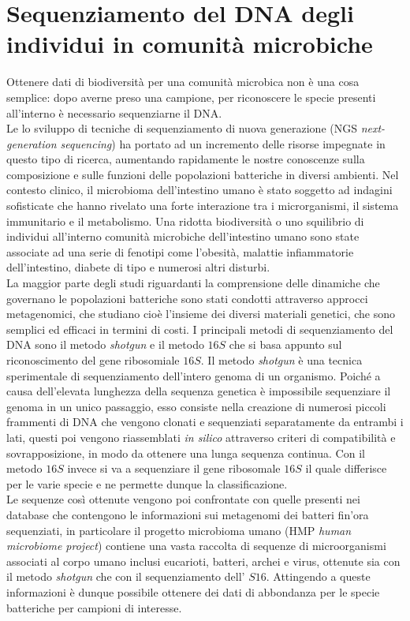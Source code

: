 \section{Sequenziamento del DNA degli individui in comunità microbiche}
Ottenere dati di biodiversità per una comunità microbica non è una cosa semplice: dopo averne preso una campione, per riconoscere le specie presenti all'interno è necessario sequenziarne il DNA.\\
Le lo sviluppo di tecniche di sequenziamento di nuova generazione (NGS \emph{next-generation sequencing}) ha portato ad un incremento delle risorse impegnate in questo tipo di ricerca, aumentando rapidamente le nostre conoscenze sulla composizione e sulle funzioni delle popolazioni batteriche in diversi ambienti\cite{shotgun}. Nel contesto clinico, il microbioma dell'intestino umano è stato soggetto ad indagini sofisticate che hanno rivelato una forte interazione tra i microrganismi, il sistema immunitario e il metabolismo. Una ridotta biodiversità o uno squilibrio di individui all'interno comunità microbiche dell'intestino umano sono state associate ad una serie di fenotipi come l'obesità, malattie infiammatorie dell'intestino, diabete di tipo  e numerosi altri disturbi.\\
La maggior parte degli studi riguardanti la comprensione delle dinamiche che governano le popolazioni batteriche sono stati condotti attraverso approcci metagenomici, che studiano cioè l'insieme dei diversi materiali genetici, che sono semplici ed efficaci in termini di costi. I principali metodi di sequenziamento del DNA sono il metodo \emph{shotgun} e il metodo $16S$ che si basa appunto sul riconoscimento del gene ribosomiale $16S$.
Il metodo \emph{shotgun} è una tecnica sperimentale di sequenziamento dell'intero genoma di un organismo\cite{HEATHER20161}. Poiché a causa dell'elevata lunghezza della sequenza genetica è impossibile sequenziare il genoma in un unico passaggio, esso consiste nella creazione di numerosi piccoli frammenti di DNA che vengono clonati e sequenziati separatamente da entrambi i lati, questi poi vengono riassemblati \emph{in silico} attraverso criteri di compatibilità e sovrapposizione, in modo da ottenere una lunga sequenza continua. Con il metodo $16S$ invece si va a sequenziare il gene ribosomale $16S$ il quale differisce per le varie specie e ne permette dunque la classificazione.\\
Le sequenze così ottenute vengono poi confrontate con quelle presenti nei database che contengono le informazioni sui metagenomi dei batteri fin'ora sequenziati, in particolare il progetto microbioma umano (HMP \emph{human microbiome project}) contiene una vasta raccolta di sequenze di microorganismi associati al corpo umano inclusi eucarioti, batteri, archei e virus, ottenute sia con il metodo \emph{shotgun} che con il sequenziamento dell' $S16$. Attingendo a queste informazioni è dunque possibile ottenere dei dati di abbondanza per le specie batteriche per campioni di interesse.



